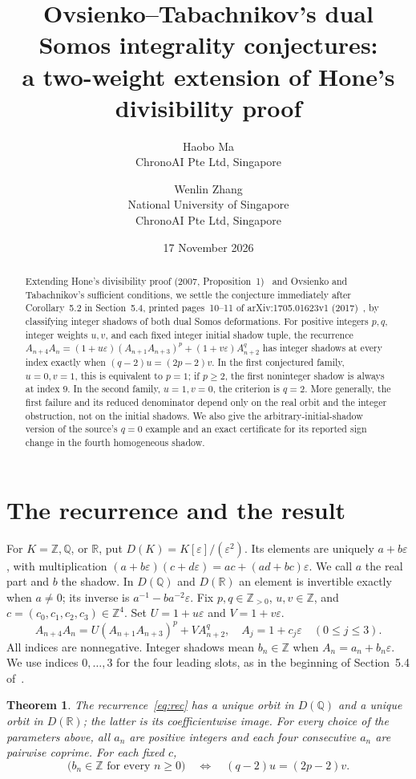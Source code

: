 \documentclass[11pt]{article}
\title{Ovsienko--Tabachnikov's dual Somos integrality conjectures:\\
a two-weight extension of Hone's divisibility proof}
\author{Haobo Ma\\\small ChronoAI Pte Ltd, Singapore
\and Wenlin Zhang\\\small National University of Singapore\\\small ChronoAI Pte Ltd, Singapore}
\date{17 November 2026}
\newtheorem{theorem}{Theorem}[section]
\newcommand{\ZZ}{\mathbb Z}
\newcommand{\QQ}{\mathbb Q}
\newcommand{\RR}{\mathbb R}
\newcommand{\eps}{\varepsilon}
\begin{document}
\maketitle
\begin{abstract}
Extending Hone's divisibility proof (2007, Proposition~1)~\cite{Hone07}
and Ovsienko and Tabachnikov's sufficient conditions, we settle the
conjecture immediately after Corollary~5.2 in Section~5.4, printed
pages~10--11 of arXiv:1705.01623v1 (2017)~\cite{OT}, by classifying
integer shadows of both dual Somos deformations. For positive integers
$p,q$, integer weights $u,v$, and each fixed integer initial shadow tuple,
the recurrence
$A_{n+4}A_n=(1+u\eps)(A_{n+1}A_{n+3})^p+(1+v\eps)A_{n+2}^q$
has integer shadows at every index exactly when
$(q-2)u=(2p-2)v$. In the first conjectured family, $u=0,v=1$,
this is equivalent to $p=1$; if $p\ge2$, the first noninteger shadow
is always at index $9$. In the second family, $u=1,v=0$, the criterion
is $q=2$. More generally, the first failure and its reduced denominator
depend only on the real orbit and the integer obstruction, not on the
initial shadows. We also give the arbitrary-initial-shadow version of
the source's $q=0$ example and an exact certificate for its reported
sign change in the fourth homogeneous shadow.
\end{abstract}

\section{The recurrence and the result}
For $K=\ZZ,\QQ$, or $\RR$, put
$D(K)=K[\eps]/(\eps^2)$. Its elements are uniquely $a+b\eps$,
with multiplication
$(a+b\eps)(c+d\eps)=ac+(ad+bc)\eps$.
We call $a$ the real part and $b$ the shadow. In $D(\QQ)$ and
$D(\RR)$ an element is invertible exactly when $a\ne0$;
its inverse is $a^{-1}-ba^{-2}\eps$.
Fix $p,q\in\ZZ_{>0}$, $u,v\in\ZZ$, and
$c=(c_0,c_1,c_2,c_3)\in\ZZ^4$. Set $U=1+u\eps$ and $V=1+v\eps$.
\begin{equation}\label{eq:rec}
 A_{n+4}A_n=U(A_{n+1}A_{n+3})^p+VA_{n+2}^q,\quad
 A_j=1+c_j\eps\quad(0\le j\le3).
\end{equation}
All indices are nonnegative. Integer shadows mean $b_n\in\ZZ$ when
$A_n=a_n+b_n\eps$. We use indices $0,\ldots,3$ for the four leading
slots, as in the beginning of Section~5.4 of~\cite{OT}.

\begin{theorem}\label{thm:main}
The recurrence~\eqref{eq:rec} has a unique orbit in $D(\QQ)$ and a unique
orbit in $D(\RR)$; the latter is its coefficientwise image. For every
choice of the parameters above, all $a_n$ are positive integers and
each four consecutive $a_n$ are pairwise coprime. For each fixed $c$,
\begin{equation}\label{eq:iff}
 \bigl(b_n\in\ZZ\text{ for every }n\ge0\bigr)
 \quad\Longleftrightarrow\quad
 (q-2)u=(2p-2)v.
\end{equation}
\end{theorem}
\end{document}
